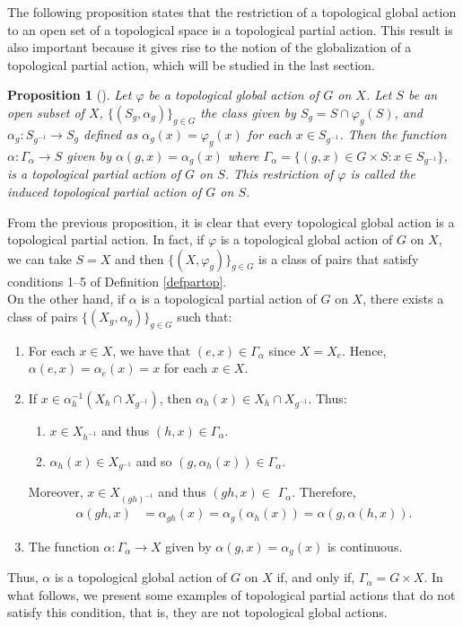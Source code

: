 \documentclass[sn-mathphys-num]{sn-jnl}%
\theoremstyle{thmstyleone}%
\newtheorem{proposition}[theorem]{Proposition}%
\theoremstyle{thmstyletwo}%
\theoremstyle{thmstylethree}%
\begin{document}
The following proposition states that the restriction of a topological global action to an open set of a topological space is a topological partial  action.
This result is also important because it gives rise to the notion of the globalization of a topological partial action, which will be studied in the last section.\\

\begin{proposition}[\cite{Abadie2}]
Let $ \varphi $ be  a topological global  action of $ G $ on $ X $. Let $ S $ be an open subset of $ X $, $ \{(S_g, \alpha_g) \} _ {g \in G} $ the class given by $ S_g = S \cap \varphi_g (S) $, and $ \alpha_g: S_ {g^{- 1}} \to S_g $  defined as $ \alpha_g (x) = \varphi_g (x) $ for each $ x \in S_ {g^{- 1}} $. Then the function $ \alpha: \Gamma _ {\alpha} \to S $ given by $ \alpha (g, x) = \alpha_{g} (x) $ where $ \Gamma_ {\alpha} = \{(g, x) \in G \times S: x \in S_{g^{-1}}\}$, is a topological partial  action of $ G $ on $ S $. This restriction of $ \varphi $ is called the induced topological partial action of $ G $ on $ S $.\\
\end{proposition}
From the previous proposition, it is clear that every topological global action is a  topological partial action.
In fact, if $ \varphi $ is a topological global  action of $ G $ on $ X $, we can take $S=X$ and then $ \{(X, \varphi_g) \}_{g \in G} $ is a class of pairs that satisfy conditions 1--5 of Definition \ref{defpartop}.\\


On the other hand, if $ \alpha $ is a topological partial action of $ G $ on $ X $, there exists a class of pairs $ \{(X_g, \alpha_g) \}_{g \in G} $ such that:
\begin{enumerate}
\item For each $ x \in X $, we have that $ (e, x) \in \Gamma_ \alpha $ since $X = X_e $. Hence, $ \alpha (e, x) = \alpha_e (x) = x $ for each $ x \in X $.
\item If $ x \in \alpha^{- 1}_h (X_{h} \cap X_{g ^ {- 1}})$, then $ \alpha_h (x) \in X_{h} \cap X_{g^{- 1}} $. Thus:
\begin{enumerate}
  \item $ x \in X_{h^{- 1}}$ and thus $(h, x)\in \Gamma_\alpha $.
  \item $ \alpha_h (x) \in X_{g^{- 1}}$ and so  $ (g, \alpha_h(x)) \in \Gamma_ \alpha $.
\end{enumerate}
Moreover, $ x \in X_{(gh)^{- 1}}$ and thus $ (gh, x) \in$ $\Gamma_\alpha $. Therefore,
\begin{align*}
\alpha (gh, x) &= \alpha_ {gh} (x) = \alpha_g (\alpha_h (x))= \alpha (g, \alpha (h, x)).
 \end{align*}
\item The function $ \alpha: \Gamma_ \alpha \to X $ given by $ \alpha (g, x) = \alpha_g (x) $ is continuous.
  \end{enumerate}
Thus, $\alpha$ is a topological global action of $G$ on $X$ if, and only if,
$\Gamma_{\alpha} = G \times X$. In what follows, we present some examples of
topological partial actions that do not satisfy this condition, that is,
they are not topological global actions.\\
\end{document}

